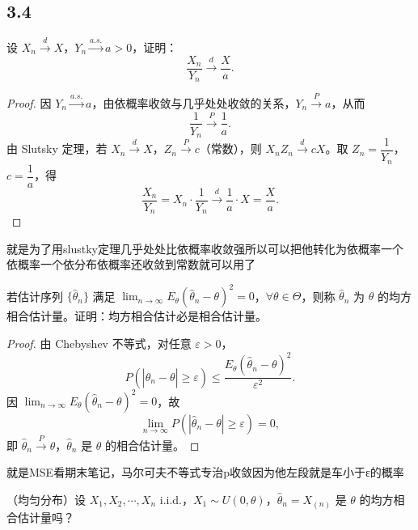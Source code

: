 \subsection{3.4}
\begin{homework}[1]
设 $X_n \xrightarrow{d} X$，$Y_n \xrightarrow{a.s.} a > 0$，证明：
\[
\frac{X_n}{Y_n} \xrightarrow{d} \frac{X}{a}.
\]
\end{homework}

\begin{proof}
因 $Y_n \xrightarrow{a.s.} a$，由依概率收敛与几乎处处收敛的关系，$Y_n \xrightarrow{P} a$，从而
\[
\frac{1}{Y_n} \xrightarrow{P} \frac{1}{a}.
\]
由 Slutsky 定理，若 $X_n \xrightarrow{d} X$，$Z_n \xrightarrow{P} c$（常数），则 $X_n Z_n \xrightarrow{d} cX$。取 $Z_n = \dfrac{1}{Y_n}$，$c = \dfrac{1}{a}$，得
\[
\frac{X_n}{Y_n} = X_n \cdot \frac{1}{Y_n} \xrightarrow{d} \frac{1}{a} \cdot X = \frac{X}{a}.
\]
\end{proof}
\begin{dxtips}
    就是为了用slustky定理几乎处处比依概率收敛强所以可以把他转化为依概率一个依概率一个依分布依概率还收敛到常数就可以用了
\end{dxtips}
\begin{homework}[1]
若估计序列 $\{\hat{\theta}_n\}$ 满足 $\lim_{n\to\infty} E_\theta(\hat{\theta}_n - \theta)^2 = 0$，$\forall \theta \in \Theta$，则称 $\hat{\theta}_n$ 为 $\theta$ 的均方相合估计量。证明：均方相合估计必是相合估计量。
\end{homework}

\begin{proof}
由 Chebyshev 不等式，对任意 $\varepsilon > 0$，
\[
P(|\hat{\theta}_n - \theta| \geq \varepsilon) \leq \frac{E_\theta(\hat{\theta}_n - \theta)^2}{\varepsilon^2}.
\]
因 $\lim_{n\to\infty} E_\theta(\hat{\theta}_n - \theta)^2 = 0$，故
\[
\lim_{n\to\infty} P(|\hat{\theta}_n - \theta| \geq \varepsilon) = 0,
\]
即 $\hat{\theta}_n \xrightarrow{P} \theta$，$\hat{\theta}_n$ 是 $\theta$ 的相合估计量。
\end{proof}
\begin{dxtips}
    就是MSE看期末笔记，马尔可夫不等式专治p收敛因为他左段就是车小于ε的概率
\end{dxtips}
\begin{homework}[2]
（均匀分布）设 $X_1, X_2, \cdots, X_n$ i.i.d.，$X_1 \sim U(0, \theta)$，$\hat{\theta}_n = X_{(n)}$ 是 $\theta$ 的均方相合估计量吗？
\end{homework}

